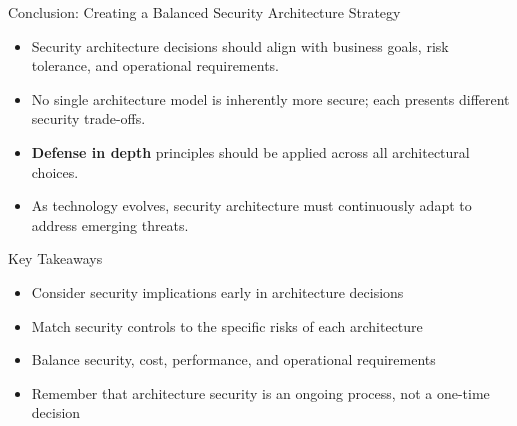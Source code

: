 \documentclass{beamer}
\begin{document}
    \begin{frame}{Conclusion: Creating a Balanced Security Architecture Strategy}
    \begin{itemize}
    \item Security architecture decisions should align with business goals, risk tolerance, and operational requirements.
    \item No single architecture model is inherently more secure; each presents different security trade-offs.
    \item \textbf{Defense in depth} principles should be applied across all architectural choices.
    \item As technology evolves, security architecture must continuously adapt to address emerging threats.
    \end{itemize}
    
    \begin{block}{Key Takeaways}
    \begin{itemize}
    \item Consider security implications early in architecture decisions
    \item Match security controls to the specific risks of each architecture
    \item Balance security, cost, performance, and operational requirements
    \item Remember that architecture security is an ongoing process, not a one-time decision
    \end{itemize}
    \end{block}
    \end{frame}
    
\end{document}
